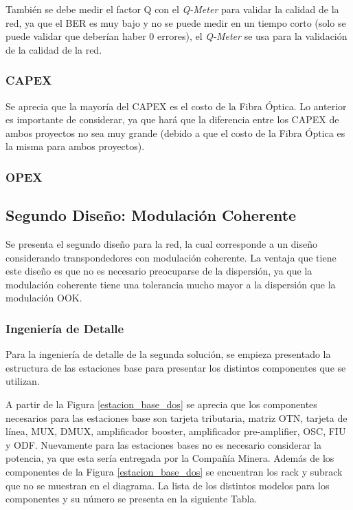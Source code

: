 \documentclass[letterpaper,11pt]{article} %
\begin{document}
\newp
También se debe medir el factor Q con el \textit{Q-Meter} para validar la calidad de la red, ya que el BER es muy bajo y no se puede medir en un tiempo corto (solo se puede validar que deberían haber 0 errores), el \textit{Q-Meter} se usa para la validación de la calidad de la red.

\subsubsection{CAPEX}
%
\newp
Se aprecia que la mayoría del CAPEX es el costo de la Fibra Óptica. Lo anterior es importante de considerar, ya que hará que la diferencia entre los CAPEX de ambos proyectos no sea muy grande (debido a que el costo de la Fibra Óptica es la misma para ambos proyectos). 


\subsubsection{OPEX}

\newpage
\subsection{Segundo Diseño: Modulación Coherente}

Se presenta el segundo diseño para la red, la cual corresponde a un diseño considerando transpondedores con modulación coherente. La ventaja que tiene este diseño es que no es necesario preocuparse de la dispersión, ya que la modulación coherente tiene una tolerancia mucho mayor a la dispersión que la modulación OOK.

\subsubsection{Ingeniería de Detalle}

Para la ingeniería de detalle de la segunda solución, se empieza presentado la estructura de las estaciones base para presentar los distintos componentes que se utilizan.


\newp
A partir de la Figura \ref{estacion_base_dos} se aprecia que los componentes necesarios para las estaciones base son tarjeta tributaria, matriz OTN, tarjeta de línea, MUX, DMUX, amplificador booster, amplificador pre-amplifier, OSC, FIU y ODF. Nuevamente para las estaciones bases no es necesario considerar la potencia, ya que esta sería entregada por la Compañía Minera. Además de los componentes de la Figura \ref{estacion_base_dos} se encuentran los rack y subrack que no se muestran en el diagrama. La lista de los distintos modelos para los componentes y su número se presenta en la siguiente Tabla.
\end{document}

